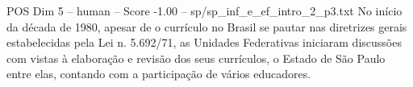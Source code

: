 \begin{textsample}{POS Dim 5 – human – Score -1.00 – sp/sp\_inf\_e\_ef\_intro\_2\_p3.txt}  \label{ex:f5_pos_019}
No início da década de 1980, apesar de o currículo no Brasil se pautar nas diretrizes gerais estabelecidas pela Lei n. 5.692/71, as Unidades Federativas iniciaram discussões com vistas à elaboração e revisão dos seus currículos, o Estado de São Paulo entre elas, contando com a participação de vários educadores.

\end{textsample}
